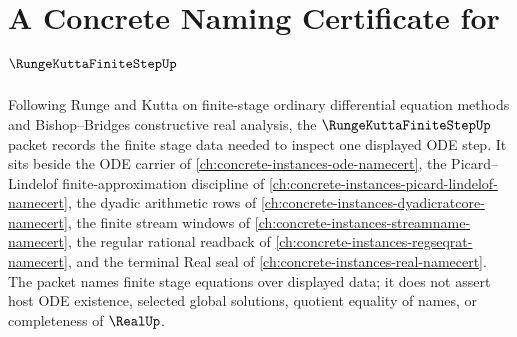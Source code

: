 \chapter{A Concrete Naming Certificate for $\RungeKuttaFiniteStepUp$}
\label{ch:concrete-instances-runge-kutta-finite-step-namecert}

Following Runge and Kutta on finite-stage ordinary differential equation methods and Bishop--Bridges constructive real analysis, the $\RungeKuttaFiniteStepUp$ packet records the finite stage data needed to inspect one displayed ODE step. It sits beside the ODE carrier of \autoref{ch:concrete-instances-ode-namecert}, the Picard--Lindelof finite-approximation discipline of \autoref{ch:concrete-instances-picard-lindelof-namecert}, the dyadic arithmetic rows of \autoref{ch:concrete-instances-dyadicratcore-namecert}, the finite stream windows of \autoref{ch:concrete-instances-streamname-namecert}, the regular rational readback of \autoref{ch:concrete-instances-regseqrat-namecert}, and the terminal Real seal of \autoref{ch:concrete-instances-real-namecert}. The packet names finite stage equations over displayed data; it does not assert host ODE existence, selected global solutions, quotient equality of names, or completeness of $\RealUp$.

